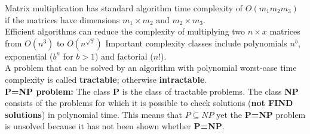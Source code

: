 \documentclass[12pt]{article}
\begin{document}
Matrix multiplication has standard algorithm time complexity of $O(m_1m_2m_3)$ if the matrices have dimensions $m_1 \times m_2$ and $m_2 \times m_3$. \\
Efficient algorithms can reduce the complexity of multiplying two $n \times x$ matrices from $O(n^3)$ to $O(n^{\sqrt{7}})$
Important complexity classes include polynomials $n^b$, exponential ($b^n$ for $b > 1$) and factorial ($n!$). \\
A problem that can be solved by an algorithm with polynomial worst-case time complexity is called \textbf{tractable}; otherwise \textbf{intractable}. \\
\textbf{P=NP problem:} The class \textbf{P} is the class of tractable problems. The class \textbf{NP} consists of the problems for which it is possible to check solutions (\textbf{not FIND solutions}) in polynomial time. This means that \textbf{$P \subseteq NP$} yet the \textbf{P=NP} problem is unsolved because it has not been shown whether \textbf{P=NP}.





 
\end{document}
